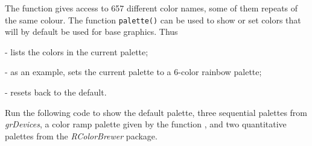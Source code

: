 The function  gives access to 657 different color names,
some of them repeats of the same colour. The function \texttt{palette()}
can be used to show or set colors that will by default be used for base
graphics.  Thus
\begin{itemizz}
  \item[-]  lists the colors in the current palette;
  \item[-] as an example,  sets the current
    palette to a 6-color rainbow palette;
  \item[-]  resets back to the default.
\end{itemizz}

  Run the following code to show the
default palette, three sequential palettes from {\em grDevices}, a
color ramp palette given by the function ,
and two quantitative palettes from the {\em RColorBrewer} package.

